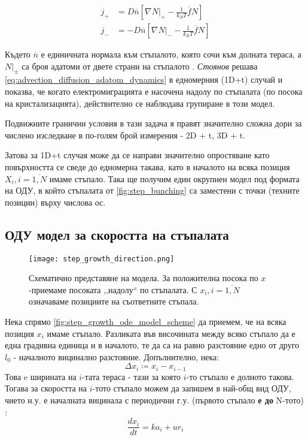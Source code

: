 \begin{align*}
	j_+  &= D \overline{n} \left[ \nabla N|_+ - \frac{1}{k_B T} \overline{f} N \right] \\
	j_-  &= - D \overline{n} \left[ \nabla N|_- - \frac{1}{k_B T} \overline{f} N \right] 
\end{align*}

Където $\overline{n}$ е единичната нормала към стъпалото, която сочи към долната тераса, а  $N|_\pm$ са броя адатоми от двете страни на стъпалото \cite{Krug2005}.
\textit{Стоянов} \cite{StoyanStoyanov1991} решава \autoref{eq:advection_diffusion_adatom_dynamics} в едномерния (1D+t) случай и показва, че когато електромиграцията е насочена надолу по стъпалата (по посока на кристализацията), действително се наблюдава групиране в този модел. 

Подвижните гранични условия в тази задача я правят значително сложна дори за числено изследване в по-голям брой измерения - 2D + t, 3D + t. 

Затова за 1D+t случая може да се направи значително опростяване като повърхността се сведе до едномерна такава, като в началото на всяка позиция $X_i, i = \overline{1,N}$ имаме стъпало. Така ще получим един окрупнен модел под формата на ОДУ, в който стъпалата от \autoref{fig:step_bunching} са заместени с точки (техните позиции) върху числова ос.

\subsection{ОДУ модел за скоростта на стъпалата}
\begin{figure}[htbp]
	\centering
	\texttt{[image: step\_growth\_direction.png]}
	\caption{Схематично представяне на модела. За положителна посока по $x$-приемаме посоката ,,надолу`` по стъпалата. С $x_{i}, i = \overline{1, N}$ означаваме позициите на съответните стъпала.}
	\label{fig:step_growth_ode_model_scheme}
\end{figure}
Нека спрямо \autoref{fig:step_growth_ode_model_scheme} да приемем, че на всяка позиция $x_{i}$ имаме стъпало. Разликата във височината между всяко стъпало да е една градивна единица и в началото, те да са на равно разстояние едно от друго $l_0$ - началното вицинално разстояние. Допълнително, нека:
\begin{equation*}
    \Delta x_i \coloneqq x_i - x_{i - 1}
\end{equation*}
Това e ширината на $i$-тата тераса - тази за която $i$-то стъпало е долното такова.
Тогава за скоростта на $i$-тото стъпало можем да запишем в най-общ вид ОДУ, чието н.у. е началната вицинала с периодични г.у. (първото стъпало \textbf{е до} N-тото) \cite{Krasteva2016}:
\begin{equation}
    \frac{d x_i}{d t} = k a_i + u r_i
    \label{eq:general_step_velocity_ode}
\end{equation}

